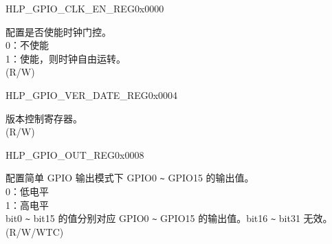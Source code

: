 \begin{register}{H}{LP\_GPIO\_CLK\_EN\_REG}{0x0000}\label{regdesc:LPGPIOCLKENREG}
%
%
\regnewline%
\begin{regdesc}\begin{reglist}
\label{fielddesc:LPGPIOCLKEN}\item [LP\_GPIO\_CLK\_EN] 配置是否使能时钟门控。\\
0：不使能\\
1：使能，则时钟自由运转。\\
(R/W)
\end{reglist}\end{regdesc}
\end{register}


\begin{register}{H}{LP\_GPIO\_VER\_DATE\_REG}{0x0004}\label{regdesc:LPGPIOVERDATEREG}
%
%
\regnewline%
\begin{regdesc}\begin{reglist}
\label{fielddesc:LPGPIOVERDATE}\item [LP\_GPIO\_VER\_DATE] 版本控制寄存器。\\
(R/W)
\end{reglist}\end{regdesc}
\end{register}


\begin{register}{H}{LP\_GPIO\_OUT\_REG}{0x0008}\label{regdesc:LPGPIOOUTREG}
%
%
\regnewline%
\begin{regdesc}\begin{reglist}
\label{fielddesc:LPGPIOOUTDATA}\item [LP\_GPIO\_OUT\_DATA]  配置简单 GPIO 输出模式下 GPIO0 \verb+~+ GPIO15 的输出值。\\
0：低电平\\
1：高电平 \\
 bit0 \verb+~+ bit15 的值分别对应 GPIO0 \verb+~+ GPIO15 的输出值。bit16 \verb+~+ bit31 无效。\\
(R/W/WTC)
\end{reglist}\end{regdesc}
\end{register}


